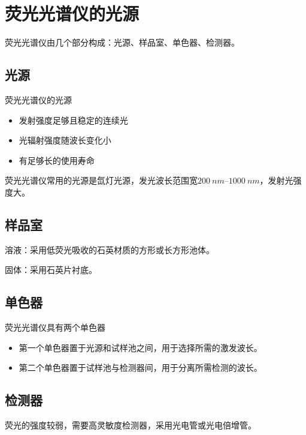 \section{荧光光谱仪的光源}

荧光光谱仪由几个部分构成：光源、样品室、单色器、检测器。

\subsection{光源}
荧光光谱仪的光源
\begin{itemize}
    \item 发射强度足够且稳定的连续光
    \item 光辐射强度随波长变化小
    \item 有足够长的使用寿命
\end{itemize}
荧光光谱仪常用的光源是氙灯光源，发光波长范围宽$\SIrange{200}{1000}{nm}$，发射光强度大。

\subsection{样品室}
溶液：采用低荧光吸收的石英材质的方形或长方形池体。

固体：采用石英片衬底。

\subsection{单色器}
荧光光谱仪具有两个单色器
\begin{itemize}
    \item 第一个单色器置于光源和试样池之间，用于选择所需的激发波长。
    \item 第二个单色器置于试样池与检测器间，用于分离所需检测的波长。
\end{itemize}

\subsection{检测器}
荧光的强度较弱，需要高灵敏度检测器，采用光电管或光电倍增管。